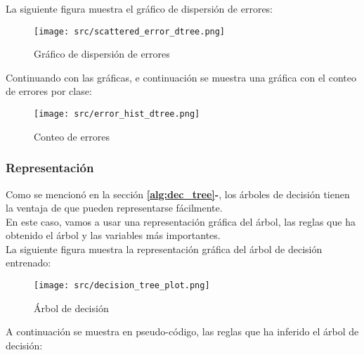 La siguiente figura muestra el gráfico de dispersión de errores:\\
 \begin{figure}[H]
	\centering
	\texttt{[image: src/scattered\_error\_dtree.png]}
	\caption{Gráfico de dispersión de errores}
	\label{fig:tree_scattered}
\end{figure}
Continuando con las gráficas, e continuación se muestra una gráfica con el conteo de errores por clase:
 \begin{figure}[H]
	\centering
	\texttt{[image: src/error\_hist\_dtree.png]}
	\caption{Conteo de errores}
	\label{fig:tree_error_plot}
\end{figure}
\subsubsection{Representación}
Como se mencionó en la sección \textbf{\ref{alg:dec_tree}-}, los árboles de decisión tienen la ventaja de que pueden representarse fácilmente. \\
En este caso, vamos a usar una representación gráfica del árbol, las reglas que ha obtenido el árbol y las variables más importantes.\\
\linebreak
La siguiente figura muestra la representación gráfica del árbol de decisión entrenado:\\
\linebreak
 \begin{figure}[H]
	\centering
	\texttt{[image: src/decision\_tree\_plot.png]}
	\caption{Árbol de decisión}
	\label{fig:decission_tree1}
\end{figure}
A continuación se muestra en pseudo-código, las reglas que ha inferido el árbol de decisión:\\

